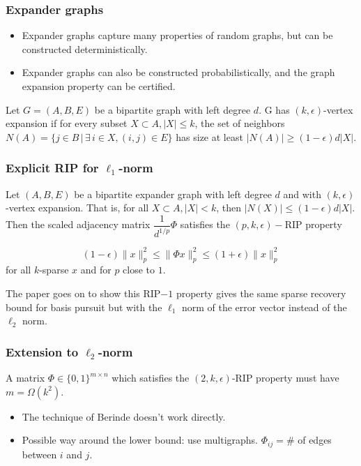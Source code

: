 \documentclass[aspectratio=34]{beamer}
\theoremstyle{plain}
\begin{document}
\begin{frame}
\frametitle{Expander graphs}
\begin{itemize}
	\item Expander graphs capture many properties of random graphs, but can be constructed deterministically. 
	\item Expander graphs can also be constructed probabilistically, and the graph expansion property can be certified. 
\end{itemize}

\begin{definition}
	Let $G = (A,B,E)$ be a bipartite graph with left degree $d$. G has $(k,\epsilon)$-vertex expansion if for every subset $X \subset A, |X| \le k$, the set of neighbors $N(A) = \{j \in B \, | \, \exists \, i \in X, (i,j) \in E\}$ has size at least $|N(A)| \ge (1-\epsilon)d|X|$.
\end{definition}

\end{frame}

\begin{frame}
    \frametitle{Explicit RIP for $\ell_1$-norm}
    \begin{theorem}
    Let $(A,B,E)$ be a bipartite expander graph with left degree $d$ and with $(k,\epsilon)$-vertex expansion. That is, for all $X \subset A, |X| < k$, then $|N(X)| \le (1-\epsilon)d|X|$. Then the scaled adjacency matrix $\dfrac{1}{d^{1/p}}\Phi$ satisfies the $(p,k,\epsilon)-$RIP property
    
    \[(1-\epsilon)\|x\|_p^2 \le \|\Phi x\|_p^2 \le (1+\epsilon)\|x\|_p^2\]
    for all $k$-sparse $x$ and for $p$ close to $1$. 
	
    \end{theorem}	

The paper goes on to show this RIP$-1$ property gives the same sparse recovery bound for basis pursuit but with the $\ell_1$ norm of the error vector instead of the $\ell_2$ norm. 

\end{frame}

\begin{frame}
\frametitle{Extension to $\ell_2$-norm}
\begin{theorem} [Chandar 08]
	A matrix $\Phi \in \{0,1\}^{m\times n}$ which satisfies the $(2,k,\epsilon)$-RIP property must have $m = \Omega(k^2)$.
\end{theorem}

\begin{itemize}
	\item The technique of Berinde doesn't work directly.
	\item Possible way around the lower bound: use multigraphs. $\Phi_{ij} = \#$ of edges between $i$ and $j$. 
\end{itemize}
\end{frame}
\end{document}
